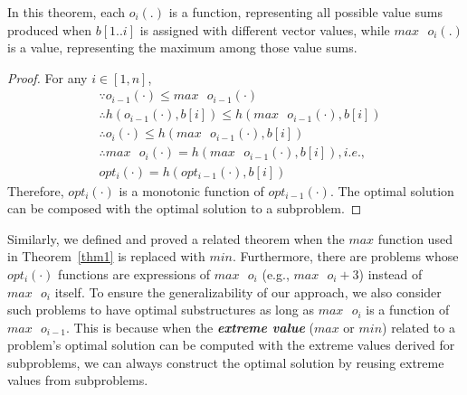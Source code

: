 In this theorem, each $o_i(.)$ is a function, representing all possible value sums produced when $b[1..i]$ is assigned with different vector values, while $max\text{ }o_i(.)$ is a value, representing the maximum among those value sums.

\begin{proof}
For any $i\in[1, n]$, 
\begin{align}
    &\because o_{i-1}(\cdot) \le max \text{ }o_{i-1}(\cdot) \nonumber\\
    & \therefore h(o_{i-1}(\cdot), b[i])\le h(max \text{ }o_{i-1}(\cdot), b[i]) \nonumber\\
     &\therefore o_i(\cdot) \le h(max \text{ }o_{i-1}(\cdot), b[i])\nonumber\\ %
     &\therefore max\text{ }o_i(\cdot)=h(max \text{ }o_{i-1}(\cdot), b[i]), i.e.,  \nonumber \\
     & opt_i(\cdot)=h(opt_{i-1}(\cdot), b[i]) \nonumber
\end{align}
Therefore, $opt_i(\cdot)$ is a monotonic function of $opt_{i-1}(\cdot)$. The optimal solution can be composed with the optimal solution to a subproblem. \qedhere  
\end{proof}

Similarly, we defined and proved a related theorem when the $max$ function used in Theorem~\ref{thm1} is replaced with $min$. Furthermore, there are problems whose $opt_i(\cdot)$ functions are expressions of $max\text{ }o_i$ (e.g., $max\text{ }o_i+3$) instead of $max\text{ }o_i$ itself. 
To ensure the generalizability of our approach, we also consider such problems 
to have optimal substructures as long as $max\text{ }o_i$ is a function of $max\text{ }o_{i-1}$. 
This is because when the \textbf{\emph{extreme value}} ($max$ or $min$) related to a problem's optimal solution can be computed 
with the extreme values derived for subproblems,
we can always construct the optimal solution by reusing extreme values from subproblems. 

